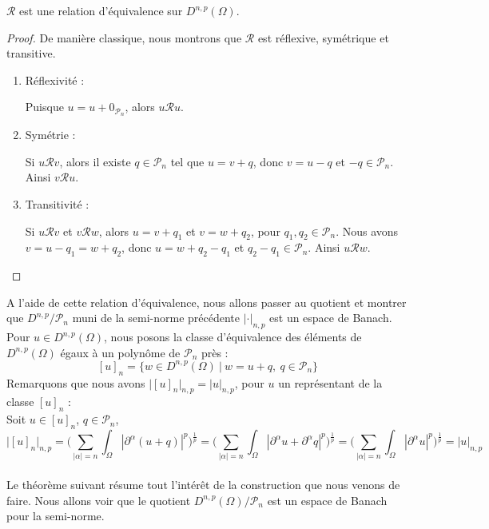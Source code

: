 \begin{lemmabox}
\begin{lemma}
    $\mathcal{R}$ est une relation d'équivalence sur $D^{n,p}(\Omega)$.
\end{lemma}
\end{lemmabox}
\begin{proof}
    De manière classique, nous montrons que $\mathcal{R}$ est réflexive, symétrique et transitive.

    \begin{enumerate}
        \item Réflexivité :
        
        Puisque $u = u + 0_{\mathscr{P}_n}$, alors $u \mathcal{R} u$.

        \item Symétrie :
        
        Si $u \mathcal{R} v$, alors il existe $q \in \mathscr{P}_n$ tel que $u = v + q$, donc $v = u - q$ et $-q \in \mathscr{P}_n$. Ainsi $v \mathcal{R} u$.

        \item Transitivité :
        
        Si $u \mathcal{R} v$ et $v \mathcal{R} w$, alors $u = v + q_1$ et $v = w + q_2$, pour $q_1,q_2 \in \mathscr{P}_n$. Nous avons $v = u - q_1 = w + q_2$, donc $u = w + q_2 - q_1$ et $q_2 - q_1 \in \mathscr{P}_n$. Ainsi $u \mathcal{R}w$.
    \end{enumerate}
\end{proof}
A l'aide de cette relation d'équivalence, nous allons passer au quotient et montrer que $D^{n,p}/\mathscr{P}_n$ muni de la semi-norme précédente $|\cdot|_{n,p}$ est un espace de Banach.
Pour $u \in D^{n,p}(\Omega)$, nous posons la classe d'équivalence des éléments de $D^{n,p}(\Omega)$ égaux à un polynôme de $\mathscr{P}_n$ près :
$$ [u]_n = \big\{ w \in D^{n,p}(\Omega) \ \big| \ w = u + q, \ q \in \mathscr{P}_n \big\} $$
Remarquons que nous avons $\big|[u]_n\big|_{n,p} = |u|_{n,p}$, pour $u$ un représentant de la classe $[u]_n$ :\\
Soit $u \in [u]_n$, $q \in \mathscr{P}_n$,
$$ \big| [u]_n \big|_{n,p} = \Bigg( \sum_{|\alpha|=n} \int_{\Omega} |\partial^{\alpha}(u + q) |^p \Bigg)^\frac{1}{p} = \Bigg( \sum_{|\alpha|=n} \int_{\Omega} |\partial^{\alpha}u + \partial^{\alpha}q |^p \Bigg)^\frac{1}{p} = \Bigg( \sum_{|\alpha|=n} \int_{\Omega} |\partial^{\alpha}u |^p \Bigg)^\frac{1}{p} = |u|_{n,p} $$\\
Le théorème suivant résume tout l'intérêt de la construction que nous venons de faire. Nous allons voir que le quotient $D^{n,p}(\Omega)/\mathscr{P}_n$ est un espace de Banach pour la semi-norme.
